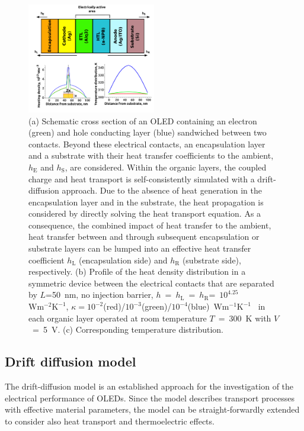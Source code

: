 \documentclass[%
9pt,
 aip,
rsi,%
 amsmath,amssymb,
preprint,%
]{revtex4-1}
\newcommand{\thermalconductivity}{$\mathrm{W m^{-1} K^{-1}}$}
\newcommand{\hcoefficient}{$\mathrm{W m^{-2} K^{-1}}$}
\begin{document}
\begin{figure}
	\centering
    \includegraphics[width=0.5\textwidth]{General_plots_0.pdf}
    \caption{(a) Schematic cross section of an OLED containing an electron (green) and hole conducting layer (blue) sandwiched between two contacts. 
    Beyond these electrical contacts, an encapsulation layer and a substrate with their heat transfer coefficients to the ambient, $h_{\mathrm{E}}$ and $h_{\mathrm{S}}$, are considered. 
    Within the organic layers, the coupled charge and heat transport is self-consistently simulated with a drift-diffusion approach. 
    Due to the absence of heat generation in the encapsulation layer and in the substrate, the heat propagation is considered by directly solving the heat transport equation. 
    As a consequence, the combined impact of heat transfer to the ambient, heat transfer between and through subsequent encapsulation or substrate layers can be lumped into an effective heat transfer coefficient %
    $h_{\mathrm{L}}$ (encapsulation side) and $h_{\mathrm{R}}$ (substrate side), respectively.
    (b) Profile of the heat density distribution in a symmetric device between the electrical contacts that are separated by $L$=50~nm, no injection barrier, $h$~=~$h_{\mathrm{L}}$~=~$h_{\mathrm{R}}$=~$10^{4.25}$~\hcoefficient, $\kappa=10^{-2}$(red)/$10^{-3}$(green)/$10^{-4}$(blue)~\thermalconductivity~ in each organic layer operated at room temperature $T$~=~300~K with $V$~=~5~V. 
    (c) Corresponding temperature distribution.}
\label{fig:setup}
\end{figure}


\subsection{Drift diffusion model} 
The drift-diffusion model is an established approach for the investigation of the electrical performance of OLEDs.\cite{Davids1998,Knapp2010,Knapp2011,Ruhstaller2003,Slawinski2011,VanMensfoort2008} 
Since the model describes transport processes with effective material parameters, the model can be straight-forwardly extended to consider also heat transport and thermoelectric effects.\cite{Park2011a}
\end{document}
